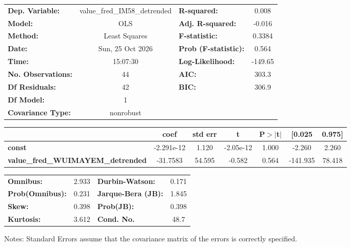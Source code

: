 \begin{center}
\begin{tabular}{lclc}
\toprule
\textbf{Dep. Variable:}                   & value\_fred\_IM58\_detrended & \textbf{  R-squared:         } &     0.008   \\
\textbf{Model:}                           &             OLS              & \textbf{  Adj. R-squared:    } &    -0.016   \\
\textbf{Method:}                          &        Least Squares         & \textbf{  F-statistic:       } &    0.3384   \\
\textbf{Date:}                            &       Sun, 25 Oct 2026       & \textbf{  Prob (F-statistic):} &    0.564    \\
\textbf{Time:}                            &           15:07:30           & \textbf{  Log-Likelihood:    } &   -149.65   \\
\textbf{No. Observations:}                &                44            & \textbf{  AIC:               } &     303.3   \\
\textbf{Df Residuals:}                    &                42            & \textbf{  BIC:               } &     306.9   \\
\textbf{Df Model:}                        &                 1            & \textbf{                     } &             \\
\textbf{Covariance Type:}                 &          nonrobust           & \textbf{                     } &             \\
\bottomrule
\end{tabular}
\begin{tabular}{lcccccc}
                                          & \textbf{coef} & \textbf{std err} & \textbf{t} & \textbf{P$> |$t$|$} & \textbf{[0.025} & \textbf{0.975]}  \\
\midrule
\textbf{const}                            &   -2.291e-12  &        1.120     & -2.05e-12  &         1.000        &       -2.260    &        2.260     \\
\textbf{value\_fred\_WUIMAYEM\_detrended} &     -31.7583  &       54.595     &    -0.582  &         0.564        &     -141.935    &       78.418     \\
\bottomrule
\end{tabular}
\begin{tabular}{lclc}
\textbf{Omnibus:}       &  2.933 & \textbf{  Durbin-Watson:     } &    0.171  \\
\textbf{Prob(Omnibus):} &  0.231 & \textbf{  Jarque-Bera (JB):  } &    1.845  \\
\textbf{Skew:}          &  0.398 & \textbf{  Prob(JB):          } &    0.398  \\
\textbf{Kurtosis:}      &  3.612 & \textbf{  Cond. No.          } &     48.7  \\
\bottomrule
\end{tabular}
\end{center}

Notes: \newline
 [1] Standard Errors assume that the covariance matrix of the errors is correctly specified.